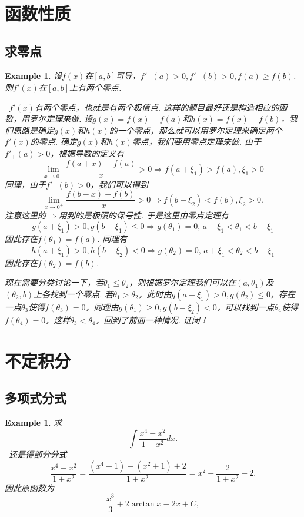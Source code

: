 \documentclass{article}
\newtheorem{example}[theorem]{Example}
\newcommand{\hints}{{\color{blue} \text{hints}}}
\begin{document}
\newpage
\section{函数性质}

\subsection{求零点}

\begin{example}
\rm 设$f(x)$在$[a,b]$可导，$f'_+(a) > 0, f'_-(b) > 0, f(a) \geq f(b)$. 则$f'(x)$在$[a,b]$上有两个零点. 

\hints\ $f'(x)$有两个零点，也就是有两个极值点. 这样的题目最好还是构造相应的函数，用罗尔定理来做. 设$g(x) = f(x)-f(a)$和$h(x)=f(x)-f(b)$，我们思路是确定$g(x)$和$h(x)$的一个零点，那么就可以用罗尔定理来确定两个$f'(x)$的零点. 确定$g(x)$和$h(x)$零点，我们要用零点定理来做. 由于$f'_+(a) > 0$，根据导数的定义有
$$
\lim\limits_{x \to 0^+} \frac{f(a+x)-f(a)}{x} > 0 \Rightarrow f(a + \xi_1) > f(a),\xi_1 > 0
$$  
同理，由于$f'_-(b) > 0$，我们可以得到
$$
\lim\limits_{x \to 0^+} \frac{f(b-x)-f(b)}{-x} > 0 \Rightarrow f(b - \xi_2) < f(b), \xi_2 > 0.
$$
注意这里的$\Rightarrow$用到的是极限的保号性. 于是这里由零点定理有
$$
g(a + \xi_1) > 0, g(b-\xi_1) \leq 0 \Rightarrow g(\theta_1) = 0, \,a+\xi_1 < \theta_1 < b-\xi_1
$$
因此存在$f(\theta_1) = f(a)$. 同理有
$$
h(a+\xi_1) > 0, h(b-\xi_2) < 0 \Rightarrow g(\theta_2) = 0, \,a+\xi_1 < \theta_2 < b-\xi_1
$$
因此存在$f(\theta_2) = f(b)$.  

现在需要分类讨论一下，若$\theta_1  \leq \theta_2$，则根据罗尔定理我们可以在$(a,\theta_1)$及$(\theta_2,b)$上各找到一个零点. 若$\theta_1 > \theta_2$，此时由$g(a+\xi_1) > 0, g(\theta_2) \leq 0$，存在一点$\theta_3$使得$f(\theta_3) = 0$，同理由$g(\theta_1) \geq 0, g(b-\xi_2) < 0$，可以找到一点$\theta_4$使得$f(\theta_4) = 0$，这样$\theta_3 < \theta_4$，回到了前面一种情况. 证闭！


\end{example}


\newpage
\section{不定积分}

\subsection{多项式分式}

\begin{example}
\rm 求
$$
\int \frac{x^4-x^2}{1+x^2}dx.
$$
\hints\ 还是得部分分式
$$
\frac{x^4-x^2}{1+x^2} = \frac{(x^4-1) -(x^2+1) + 2 }{1+x^2}
= x^2 + \frac{2}{1+x^2}-2.
$$
因此原函数为
$$
\frac{x^3}{3} + 2\arctan x - 2x + C,
$$ 
\end{example}
\end{document}

